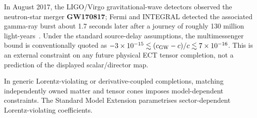 \documentclass[11pt,a4paper]{article}
\begin{document}
In August 2017, the LIGO/Virgo gravitational-wave detectors observed the neutron-star merger \textbf{GW170817}; Fermi and INTEGRAL detected the associated gamma-ray burst about 1.7 seconds later after a journey of roughly 130 million light-years~\cite{LIGO_Virgo_GW170817_2017}.  Under the standard source-delay assumptions, the multimessenger bound is conventionally quoted as $-3\times10^{-15}\lesssim(c_{\rm GW}-c)/c\lesssim7\times10^{-16}$.  This is an external constraint on any future physical ECT tensor completion, not a prediction of the displayed scalar/director map.

In generic Lorentz-violating or derivative-coupled completions, matching
independently owned matter and tensor cones imposes model-dependent
constraints.  The Standard Model Extension parametrises sector-dependent
Lorentz-violating coefficients.
\end{document}
